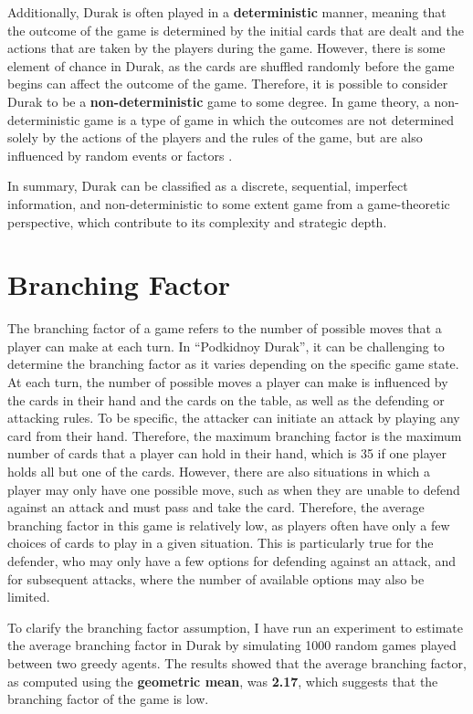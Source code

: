 Additionally, Durak is often played in a \textbf{deterministic} manner, meaning that the outcome of the game is determined by the initial cards that are dealt and the actions that are taken by the players during the game. However, there is some element of chance in Durak, as the cards are shuffled randomly before the game begins can affect the outcome of the game. Therefore, it is possible to consider Durak to be a \textbf{non-deterministic} game to some degree. In game theory, a non-deterministic game is a type of game in which the outcomes are not determined solely by the actions of the players and the rules of the game, but are also influenced by random events or factors \citep{Gametheory4}. 

In summary, Durak can be classified as a discrete, sequential, imperfect information, and non-deterministic to some extent game from a game-theoretic perspective, which contribute to its complexity and strategic depth.


\section{Branching Factor}

The branching factor of a game refers to the number of possible moves that a player can make at each turn. In ``Podkidnoy Durak'', it can be challenging to determine the branching factor as it varies depending on the specific game state. At each turn, the number of possible moves a player can make is influenced by the cards in their hand and the cards on the table, as well as the defending or attacking rules. To be specific, the attacker can initiate an attack by playing any card from their hand. Therefore, the maximum branching factor is the maximum number of cards that a player can hold in their hand, which is 35 if one player holds all but one of the cards. However, there are also situations in which a player may only have one possible move, such as when they are unable to defend against an attack and must pass and take the card. Therefore, the average branching factor in this game is relatively low, as players often have only a few choices of cards to play in a given situation. This is particularly true for the defender, who may only have a few options for defending against an attack, and for subsequent attacks, where the number of available options may also be limited.

To clarify the branching factor assumption, I have run an experiment to estimate the average branching factor in Durak by simulating 1000 random games played between two greedy agents. The results showed that the average branching factor, as computed using the \textbf{geometric mean}, was \textbf{2.17}, which suggests that the branching factor of the game is low. 

